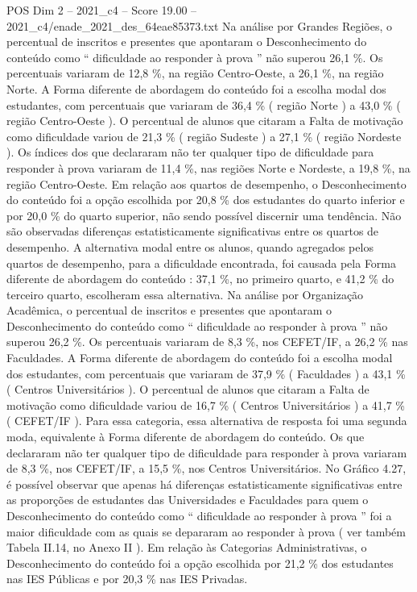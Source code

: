\begin{textsample}{POS Dim 2 – 2021\_c4 – Score 19.00 – 2021\_c4/enade\_2021\_des\_64eae85373.txt}
Na análise por Grandes Regiões, o percentual de inscritos e presentes que apontaram o Desconhecimento do conteúdo como “ dificuldade ao responder à prova ” não superou 26,1 \%.
Os percentuais variaram de 12,8 \%, na região Centro-Oeste, a 26,1 \%, na região Norte.
A Forma diferente de abordagem do conteúdo foi a escolha modal dos estudantes, com percentuais que variaram de 36,4 \% ( região Norte ) a 43,0 \% ( região Centro-Oeste ).
O percentual de alunos que citaram a Falta de motivação como dificuldade variou de 21,3 \% ( região Sudeste ) a 27,1 \% ( região Nordeste ).
Os índices dos que declararam não ter qualquer tipo de dificuldade para responder à prova variaram de 11,4 \%, nas regiões Norte e Nordeste, a 19,8 \%, na região Centro-Oeste.
Em relação aos quartos de desempenho, o Desconhecimento do conteúdo foi a opção escolhida por 20,8 \% dos estudantes do quarto inferior e por 20,0 \% do quarto superior, não sendo possível discernir uma tendência.
Não são observadas diferenças estatisticamente significativas entre os quartos de desempenho.
A alternativa modal entre os alunos, quando agregados pelos quartos de desempenho, para a dificuldade encontrada, foi causada pela Forma diferente de abordagem do conteúdo : 37,1 \%, no primeiro quarto, e 41,2 \% do terceiro quarto, escolheram essa alternativa.
Na análise por Organização Acadêmica, o percentual de inscritos e presentes que apontaram o Desconhecimento do conteúdo como “ dificuldade ao responder à prova ” não superou 26,2 \%.
Os percentuais variaram de 8,3 \%, nos CEFET/IF, a 26,2 \% nas Faculdades.
A Forma diferente de abordagem do conteúdo foi a escolha modal dos estudantes, com percentuais que variaram de 37,9 \% ( Faculdades ) a 43,1 \% ( Centros Universitários ).
O percentual de alunos que citaram a Falta de motivação como dificuldade variou de 16,7 \% ( Centros Universitários ) a 41,7 \% ( CEFET/IF ).
Para essa categoria, essa alternativa de resposta foi uma segunda moda, equivalente à Forma diferente de abordagem do conteúdo.
Os que declararam não ter qualquer tipo de dificuldade para responder à prova variaram de 8,3 \%, nos CEFET/IF, a 15,5 \%, nos Centros Universitários.
No Gráfico 4.27, é possível observar que apenas há diferenças estatisticamente significativas entre as proporções de estudantes das Universidades e Faculdades para quem o Desconhecimento do conteúdo como “ dificuldade ao responder à prova ” foi a maior dificuldade com as quais se depararam ao responder à prova ( ver também Tabela II.14, no Anexo II ).
Em relação às Categorias Administrativas, o Desconhecimento do conteúdo foi a opção escolhida por 21,2 \% dos estudantes nas IES Públicas e por 20,3 \% nas IES Privadas.

\end{textsample}

